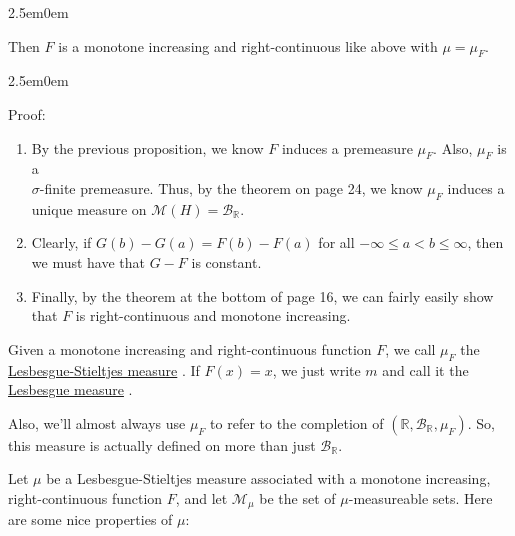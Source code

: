 \documentclass{book}
\newcommand{\hThree}{%
   \color{PineGreen!85!Orange}
   \fontsize{12}{14}\selectfont%
}
\newenvironment{myIndent}{%
   \begin{adjustwidth}{2.5em}{0em}%
}{%
   \end{adjustwidth}%
}
\newcommand{\udefine}[1]{{%
   \setulcolor{Red}%
   \setul{0.14em}{0.07em}%
   \ul{#1}%
}}
\newcommand{\retTwo}{\hfill\bigbreak}
\begin{document}
\begin{myIndent}
\begin{enumerate}
      Then $F$ is a monotone increasing and right-continuous like above with $\mu = \mu_F$.
   \end{enumerate}
   
   \begin{myIndent}\hThree
      Proof:
      \begin{enumerate}
         \item By the previous proposition, we know $F$ induces a premeasure $\mu_F$. Also, $\mu_F$ is a\\ $\sigma$-finite premeasure. Thus, by the theorem on page 24, we know $\mu_F$ induces a unique measure on $\mathcal{M}(H) = \mathcal{B}_{\mathbb{R}}$.\retTwo
   
         \item Clearly, if $G(b) - G(a) = F(b) - F(a)$ for all $-\infty \leq a < b \leq \infty$, then we must have that $G - F$ is constant.\retTwo
   
         \item Finally, by the theorem at the bottom of page 16, we can fairly easily show that $F$ is right-continuous and monotone increasing.\retTwo
      \end{enumerate}
   \end{myIndent}
\end{myIndent}

Given a monotone increasing and right-continuous function $F$, we call $\mu_F$ the\\ \udefine{Lesbesgue-Stieltjes measure}. If $F(x) = x$, we just write $m$ and call it the\\ \udefine{Lesbesgue measure}.\retTwo

Also, we'll almost always use $\mu_F$ to refer to the completion of $(\mathbb{R}, \mathcal{B}_{\mathbb{R}}, \mu_F)$. So, this measure is actually defined on more than just $\mathcal{B}_{\mathbb{R}}$.\newpage

Let $\mu$ be a Lesbesgue-Stieltjes measure associated with a monotone increasing, right-continuous function $F$, and let $\mathcal{M}_{\mu}$ be the set of $\mu$-measureable sets. Here are some nice properties of $\mu$:
\end{document}

